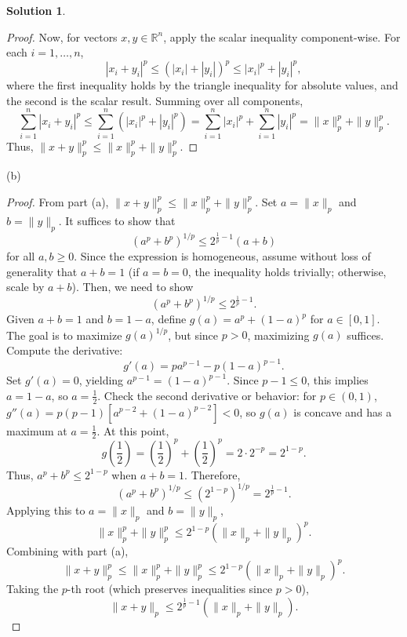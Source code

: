 \documentclass[12pt]{article}
\theoremstyle{definition}
\newtheorem*{solution}{\normalfont\textbf{Solution}}
\begin{document}
\begin{enumerate}[leftmargin=*]
\begin{solution}
\begin{proof}
                    Now, for vectors \( x, y \in \mathbb{R}^n \), apply the scalar inequality component-wise. For each \( i = 1, \dots, n \),
                    \[
                    |x_i + y_i|^p \leq (|x_i| + |y_i|)^p \leq |x_i|^p + |y_i|^p,
                    \]
                    where the first inequality holds by the triangle inequality for absolute values, and the second is the scalar result. Summing over all components,
                    \[
                    \sum_{i=1}^n |x_i + y_i|^p \leq \sum_{i=1}^n (|x_i|^p + |y_i|^p) = \sum_{i=1}^n |x_i|^p + \sum_{i=1}^n |y_i|^p = \|x\|_p^p + \|y\|_p^p.
                    \]
                    Thus, \( \|x + y\|_p^p \leq \|x\|_p^p + \|y\|_p^p \).
                \end{proof}
        \item[(b)] 
            \begin{proof}
                From part (a), \( \|x + y\|_p^p \leq \|x\|_p^p + \|y\|_p^p \). Set \( a = \|x\|_p \) and \( b = \|y\|_p \). It suffices to show that
                \[
                (a^p + b^p)^{1/p} \leq 2^{\frac{1}{p} - 1} (a + b)
                \]
                for all \( a, b \geq 0 \). Since the expression is homogeneous, assume without loss of generality that \( a + b = 1 \) (if \( a = b = 0 \), the inequality holds trivially; otherwise, scale by \( a + b \)). Then, we need to show
                \[
                (a^p + b^p)^{1/p} \leq 2^{\frac{1}{p} - 1}.
                \]
                Given \( a + b = 1 \) and \( b = 1 - a \), define \( g(a) = a^p + (1 - a)^p \) for \( a \in [0,1] \). The goal is to maximize \( g(a)^{1/p} \), but since \( p > 0 \), maximizing \( g(a) \) suffices. Compute the derivative:
                \[
                g'(a) = p a^{p-1} - p (1 - a)^{p-1}.
                \]
                Set \( g'(a) = 0 \), yielding \( a^{p-1} = (1 - a)^{p-1} \). Since \( p - 1 \leq 0 \), this implies \( a = 1 - a \), so \( a = \frac{1}{2} \). Check the second derivative or behavior: for \( p \in (0,1) \), \( g''(a) = p(p-1)[a^{p-2} + (1-a)^{p-2}] < 0 \), so \( g(a) \) is concave and has a maximum at \( a = \frac{1}{2} \). At this point,
                \[
                g\left(\frac{1}{2}\right) = \left(\frac{1}{2}\right)^p + \left(\frac{1}{2}\right)^p = 2 \cdot 2^{-p} = 2^{1 - p}.
                \]
                Thus, \( a^p + b^p \leq 2^{1 - p} \) when \( a + b = 1 \). Therefore,
                \[
                (a^p + b^p)^{1/p} \leq (2^{1 - p})^{1/p} = 2^{\frac{1}{p} - 1}.
                \]
                Applying this to \( a = \|x\|_p \) and \( b = \|y\|_p \),
                \[
                \|x\|_p^p + \|y\|_p^p \leq 2^{1 - p} (\|x\|_p + \|y\|_p)^p.
                \]
                Combining with part (a),
                \[
                \|x + y\|_p^p \leq \|x\|_p^p + \|y\|_p^p \leq 2^{1 - p} (\|x\|_p + \|y\|_p)^p.
                \]
                Taking the \( p \)-th root (which preserves inequalities since \( p > 0 \)),
                \[
                \|x + y\|_p \leq 2^{\frac{1}{p} - 1} (\|x\|_p + \|y\|_p).
                \]
            \end{proof}



\end{solution}
\end{enumerate}
\end{document}
